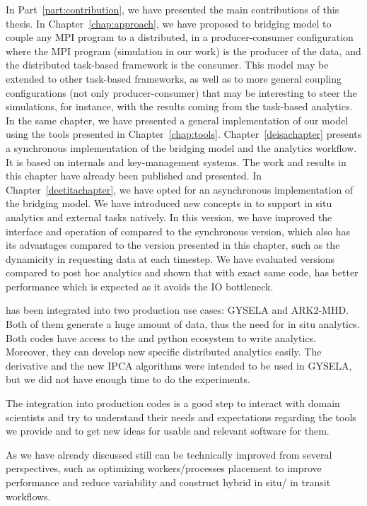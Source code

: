 In Part~\ref{part:contribution}, we have presented the main contributions of this thesis. In Chapter~\ref{chap:approach}, we have proposed to bridging model to couple any MPI program to a \dask distributed, in a producer-consumer configuration where the MPI program (simulation in our work) is the producer of the data, and the distributed task-based framework is the consumer. This model may be extended to other task-based frameworks, as well as to more general coupling configurations (not only producer-consumer) that may be interesting to steer the simulations, for instance, with the results coming from the task-based analytics.    
In the same chapter, we have presented a general implementation of our model using the tools presented in Chapter~\ref{chap:tools}. 
Chapter~\ref{deisachapter} presents a synchronous implementation of the bridging model and the analytics workflow. It is based on \dask internals and key-management systems. The work and results in this chapter have already been published and presented. 
In Chapter~\ref{deetitachapter}, we have opted for an asynchronous implementation of the bridging model. We have introduced new concepts in \dask to support in situ analytics and external tasks natively. In this version, we have improved the interface and operation of \deisa compared to the synchronous version, which also has its advantages compared to the version presented in this chapter, such as the dynamicity in requesting data at each timestep.
We have evaluated \deisa versions compared to post hoc analytics and shown that with exact same code, \deisa has better performance which is expected as it avoids the IO bottleneck.

\deisa has been integrated into two production use cases: GYSELA and ARK2-MHD. Both of them generate a huge amount of data, thus the need for in situ analytics. Both codes have access to the \dask and python ecosystem to write analytics. Moreover, they can develop new specific distributed analytics easily. The derivative and the new IPCA algorithms were intended to be used in GYSELA, but we did not have enough time to do the experiments.     

The integration into production codes is a good step to interact with domain scientists and try to understand their needs and expectations regarding the tools we provide and to get new ideas for usable and relevant software for them.

As we have already discussed \deisa still can be technically improved from several perspectives, such as optimizing workers/processes placement to improve performance and reduce variability and construct hybrid in situ/ in transit workflows. 


